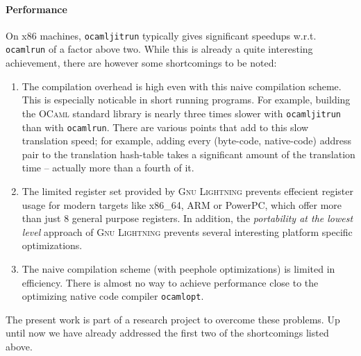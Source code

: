 \documentclass[10pt,a4paper,twocolumn]{article}
\begin{document}
\paragraph{Performance}

On x86 machines, \texttt{ocamljitrun} typically gives significant
speedups w.r.t. \texttt{ocamlrun} of a factor above two. While this is already a quite
interesting achievement, there are however some shortcomings to be noted:
\begin{enumerate}
\item The compilation overhead is high even with this naive compilation scheme. This is
  especially noticable in short running programs. For example, building the \textsc{OCaml}
  standard library is nearly three times slower with \texttt{ocamljitrun} than with
  \texttt{ocamlrun}. There are various points that add to this slow translation speed; for
  example, adding every (byte-code, native-code) address pair to the translation
  hash-table takes a significant amount of the translation time -- actually more than a fourth
  of it\cite{Starynkevitch04}.
\item The limited register set provided by \textsc{Gnu Lightning} prevents effecient register
  usage for modern targets like x86\_64, ARM or PowerPC, which offer more than just 8 general
  purpose registers. In addition, the \emph{portability at the lowest level} approach of
  \textsc{Gnu Lightning} prevents several interesting platform specific optimizations.
\item The naive compilation scheme (with peephole optimizations) is limited in efficiency. There
  is almost no way to achieve performance close to the optimizing native code compiler \texttt{ocamlopt}.
\end{enumerate}
The present work is part of a research project to overcome these problems. Up until now we have
already addressed the first two of the shortcomings listed above.



\end{document}
